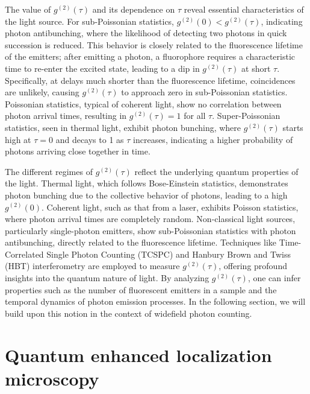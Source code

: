 The value of $ g^{(2)}(\tau) $ and its dependence on $ \tau $ reveal essential characteristics of the light source. For sub-Poissonian statistics, $ g^{(2)}(0) < g^{(2)}(\tau) $, indicating photon antibunching, where the likelihood of detecting two photons in quick succession is reduced. This behavior is closely related to the fluorescence lifetime of the emitters; after emitting a photon, a fluorophore requires a characteristic time to re-enter the excited state, leading to a dip in $ g^{(2)}(\tau) $ at short $ \tau $. Specifically, at delays much shorter than the fluorescence lifetime, coincidences are unlikely, causing $ g^{(2)}(\tau) $ to approach zero in sub-Poissonian statistics. Poissonian statistics, typical of coherent light, show no correlation between photon arrival times, resulting in $ g^{(2)}(\tau) = 1 $ for all $ \tau $. Super-Poissonian statistics, seen in thermal light, exhibit photon bunching, where $ g^{(2)}(\tau) $ starts high at $ \tau = 0 $ and decays to 1 as $ \tau $ increases, indicating a higher probability of photons arriving close together in time.

The different regimes of $ g^{(2)}(\tau) $ reflect the underlying quantum properties of the light. Thermal light, which follows Bose-Einstein statistics, demonstrates photon bunching due to the collective behavior of photons, leading to a high $ g^{(2)}(0) $. Coherent light, such as that from a laser, exhibits Poisson statistics, where photon arrival times are completely random. Non-classical light sources, particularly single-photon emitters, show sub-Poissonian statistics with photon antibunching, directly related to the fluorescence lifetime. Techniques like Time-Correlated Single Photon Counting (TCSPC) and Hanbury Brown and Twiss (HBT) interferometry are employed to measure $ g^{(2)}(\tau) $, offering profound insights into the quantum nature of light. By analyzing $ g^{(2)}(\tau) $, one can infer properties such as the number of fluorescent emitters in a sample and the temporal dynamics of photon emission processes. In the following section, we will build upon this notion in the context of widefield photon counting. 


\section{Quantum enhanced localization microscopy}

